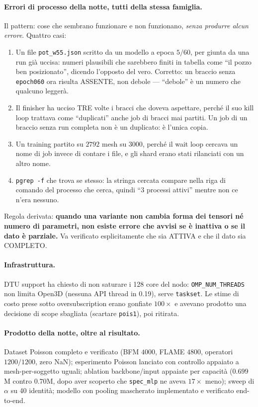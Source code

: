 \documentclass[11pt,a4paper]{article}
\begin{document}
\paragraph{Errori di processo della notte, tutti della stessa famiglia.} Il pattern: cose che
sembrano funzionare e non funzionano, \emph{senza produrre alcun errore}. Quattro casi:
\begin{enumerate}
\item Un file \texttt{pot\_w55.json} scritto da un modello a epoca $5/60$, per giunta da una
      run già uccisa: numeri plausibili che sarebbero finiti in tabella come ``il pozzo ben
      posizionato'', dicendo l'opposto del vero. Corretto: un braccio senza \texttt{epoch060}
      ora risulta ASSENTE, non debole --- ``debole'' è un numero che qualcuno leggerà.
\item Il finisher ha ucciso TRE volte i bracci che doveva aspettare, perché il suo kill loop
      trattava come ``duplicati'' anche job di bracci mai partiti. Un job di un braccio senza
      run completa non è un duplicato: è l'unica copia.
\item Un training partito su $2792$ mesh su $3000$, perché il wait loop cercava un nome di job
      invece di contare i file, e gli shard erano stati rilanciati con un altro nome.
\item \texttt{pgrep -f} che trova se stesso: la stringa cercata compare nella riga di comando
      del processo che cerca, quindi ``3 processi attivi'' mentre non ce n'era nessuno.
\end{enumerate}
Regola derivata: \textbf{quando una variante non cambia forma dei tensori né numero di
parametri, non esiste errore che avvisi se è inattiva o se il dato è parziale.} Va verificato
esplicitamente che sia ATTIVA e che il dato sia COMPLETO.

\paragraph{Infrastruttura.} DTU support ha chiesto di non saturare i 128 core del nodo:
\texttt{OMP\_NUM\_THREADS} non limita Open3D (nessuna API thread in 0.19), serve
\texttt{taskset}. Le stime di costo prese sotto oversubscription erano gonfiate $100\times$ e
avevano prodotto una decisione di scope sbagliata (scartare \texttt{pois1}), poi ritirata.

\paragraph{Prodotto della notte, oltre al risultato.} Dataset Poisson completo e verificato
(BFM $4000$, FLAME $4800$, operatori $1200/1200$, zero NaN); esperimento Poisson lanciato con
controllo appaiato a mesh-per-soggetto uguali; ablation backbone/input appaiate per capacità
($0.699$M contro $0.70$M, dopo aver scoperto che \texttt{spec\_mlp} ne aveva $17\times$ meno);
sweep di $\alpha$ su 40 identità; modello con pooling mascherato implementato e verificato
end-to-end.
\end{document}
